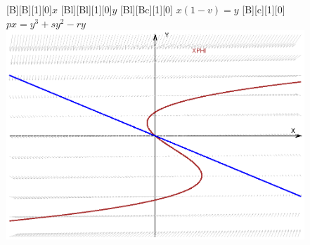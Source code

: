 \documentclass[12pt]{article}
\begin{document}
  
  
    \begin{figure}
      [B][B][1][0]{$x$}
      [Bl][Bl][1][0]{$y$}
      [Bl][Bc][1][0]{\color{blue} $x(1-v)=y$}
      [B][c][1][0]{\color{brown} $ px =  y^3 + s y^2  - ry $}
      \includegraphics{saltzman.eps}
    \end{figure}
  
    
\end{document}
